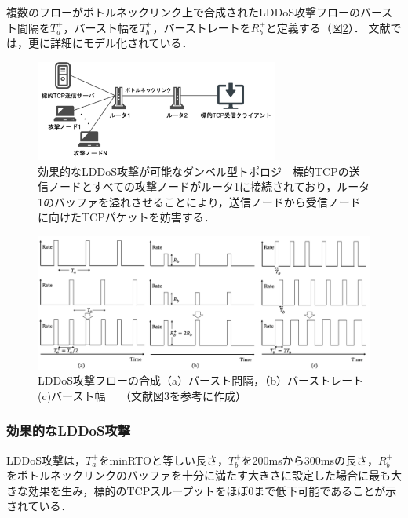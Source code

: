 \documentclass[Japanese]{dicomopapers}
\begin{document}
複数のフローがボトルネックリンク上で合成されたLDDoS攻撃フローのバースト間隔を$T_a^+$，バースト幅を$T_b^+$，バーストレートを$R_b^+$と定義する（図\ref{fig:lddos-example}）．
文献\cite{cpr1}では，更に詳細にモデル化されている．

\begin{figure}[tb]
    \begin{center}
        \includegraphics[clip,width=8.0cm]{images/dumbbell.png}
        \caption{効果的なLDDoS攻撃が可能なダンベル型トポロジ　標的TCPの送信ノードとすべての攻撃ノードがルータ1に接続されており，ルータ1のバッファを溢れさせることにより，送信ノードから受信ノードに向けたTCPパケットを妨害する．}
        \label{fig:dumbbell-topology}
    \end{center}
\end{figure}

\begin{figure}[t]
    \begin{center}
      \includegraphics[clip,width=17.0cm]{images/lddos-example.png}
      \caption{LDDoS攻撃フローの合成（a）バースト間隔，（b）バーストレート (c)バースト幅　
      （文献\cite{cpr1}図3を参考に作成）}
      \label{fig:lddos-example}
    \end{center}
\end{figure}

\subsubsection{効果的なLDDoS攻撃}
LDDoS攻撃は，$T_a^+$をminRTOと等しい長さ，$T_b^+$を200msから300msの長さ，$R_b^+$をボトルネックリンクのバッファを十分に満たす大きさに設定した場合に最も大きな効果を生み，標的のTCPスループットをほぼ0まで低下可能であることが示されている\cite{ldos}\cite{practical-ldos-defense}．
\end{document}
